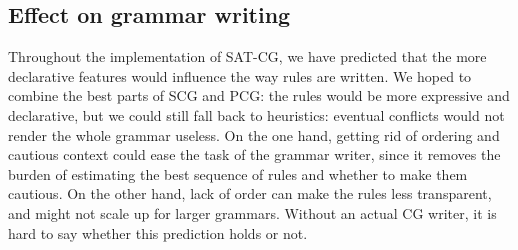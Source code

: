 


\subsection{Effect on grammar writing}

Throughout the implementation of SAT-CG, we have predicted that the more declarative features would influence the way rules are written. 
We hoped to combine the best parts of SCG and PCG: 
the rules would be more expressive and declarative, 
but we could still fall back to heuristics: eventual 
conflicts would not render the whole grammar useless.
On the one hand, getting rid of ordering and cautious context could ease the task of the grammar writer, since it removes the burden of estimating the best sequence of rules and whether to make them cautious. On the other hand, lack of order can make the rules less transparent, and might not scale up for larger grammars.
Without an actual CG writer, it is hard to say whether this prediction holds or not.

